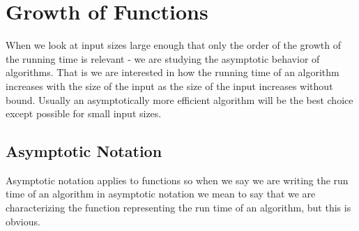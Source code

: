 \documentclass{scrartcl}
\theoremstyle{definition}
\theoremstyle{definition}
\theoremstyle{remark}
\numberwithin{equation}{section}
\begin{document}
\section{Growth of Functions}
When we look at input sizes large enough that only the order of the growth of the running time is relevant - we are studying the asymptotic behavior of algorithms. That is we are interested in how the running time of an algorithm increases with the size of the input as the size of the input increases without bound. Usually an asymptotically more efficient algorithm will be the best choice except possible for small input sizes. \\
\subsection{Asymptotic Notation}
Asymptotic notation applies to functions so when we say we are writing the run time of an algorithm in asymptotic notation we mean to say that we are characterizing the function representing the run time of an algorithm, but this is obvious.
\end{document}
